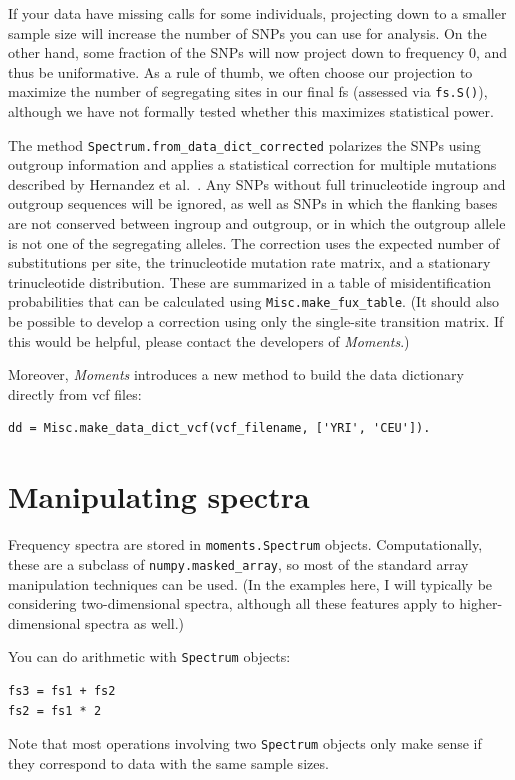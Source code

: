 \documentclass[12pt]{article}
\makeatletter
\newcommand{\py}[1]{\lstinline[breaklines=true,language=Python, showstringspaces=False]@#1@}
\makeatother
\begin{document}
If your data have missing calls for some individuals, projecting down to a smaller sample size will increase the number of SNPs you can use for analysis.
On the other hand, some fraction of the SNPs will now project down to frequency 0, and thus be uniformative.
As a rule of thumb, we often choose our projection to maximize the number of segregating sites in our final fs (assessed via \py{fs.S()}), although we have not formally tested whether this maximizes statistical power.

The method \py{Spectrum.from_data_dict_corrected} polarizes the SNPs using outgroup information and applies a statistical correction for multiple mutations described by Hernandez et al.~\cite{bib:Hernandez2007}.
Any SNPs without full trinucleotide ingroup and outgroup sequences will be ignored, as well as SNPs in which the flanking bases are not conserved between ingroup and outgroup, or in which the outgroup allele is not one of the segregating alleles.
The correction uses the expected number of substitutions per site, the trinucleotide mutation rate matrix, and a stationary trinucleotide distribution.
These are summarized in a table of misidentification probabilities that can be calculated using \py{Misc.make_fux_table}.
(It should also be possible to develop a correction using only the single-site transition matrix.
If this would be helpful, please contact the developers of \textit{Moments}.)

Moreover, \textit{Moments} introduces a new method to build the data dictionary directly from vcf files: 
\begin{lstlisting}
dd = Misc.make_data_dict_vcf(vcf_filename, ['YRI', 'CEU']).
\end{lstlisting}

\section{Manipulating spectra}\label{sec:manip}

Frequency spectra are stored in \py{moments.Spectrum} objects.
Computationally, these are a subclass of \py{numpy.masked_array}, so most of the standard array manipulation techniques can be used.
(In the examples here, I will typically be considering two-dimensional spectra, although all these features apply to higher-dimensional spectra as well.)

You can do arithmetic with \py{Spectrum} objects:
\begin{lstlisting}
fs3 = fs1 + fs2
fs2 = fs1 * 2
\end{lstlisting}
Note that most operations involving two \py{Spectrum} objects only make sense if they correspond to data with the same sample sizes.
\end{document}
